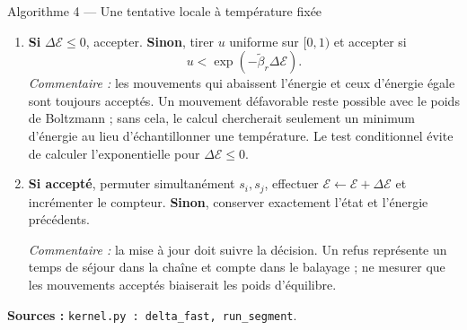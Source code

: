 \documentclass[10pt,a4paper]{article}
\begin{document}
\begin{algocode}{Algorithme 4 --- Une tentative locale à température fixée}
\begin{enumerate}
le nombre de paires Au--Cu change de $2(b_i-b_j)$ : perdre un voisin Au
et gagner un voisin Cu ont des contributions opposées. D'où
$12600=2\times6300$. La formule est exacte à composition fixée et ne
requiert que deux listes de 18 voisins.
\item \textbf{Si} $\Delta\mathcal E\le0$, accepter. \textbf{Sinon}, tirer
$u$ uniforme sur $[0,1)$ et accepter si
\[
u<\exp(-\widetilde\beta_r\Delta\mathcal E).
\]
\textit{Commentaire :} les mouvements qui abaissent l'énergie et ceux
d'énergie égale sont toujours acceptés. Un mouvement défavorable reste
possible avec le poids de Boltzmann ; sans cela, le calcul chercherait
seulement un minimum d'énergie au lieu d'échantillonner une température.
Le test conditionnel évite de calculer l'exponentielle pour $\Delta\mathcal E\le0$.
\item \textbf{Si accepté}, permuter simultanément $s_i,s_j$, effectuer
$\mathcal E\leftarrow\mathcal E+\Delta\mathcal E$ et incrémenter le compteur.
\textbf{Sinon}, conserver exactement l'état et l'énergie précédents.
\par\textit{Commentaire :} la mise à jour doit suivre la décision. Un refus
représente un temps de séjour dans la chaîne et compte dans le balayage ;
ne mesurer que les mouvements acceptés biaiserait les poids d'équilibre.
\end{enumerate}
\textbf{Sources :} \texttt{kernel.py : delta\_fast, run\_segment}.
\end{algocode}
\end{document}
